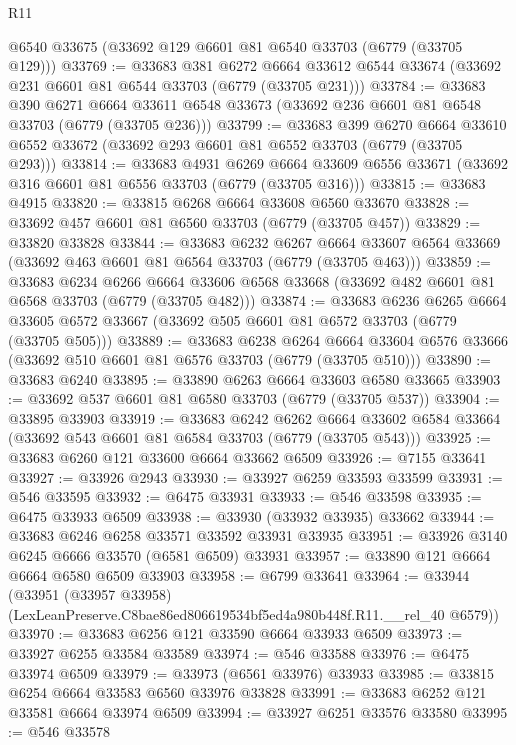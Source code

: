 \begin{lexlean}{R11}
\begin{coremodule}
    @6540
    @33675
    (@33692 @129 @6601 @81 @6540 @33703 (@6779 (@33705 @129)))
@33769 := @33683
    @381
    @6272
    @6664
    @33612
    @6544
    @33674
    (@33692 @231 @6601 @81 @6544 @33703 (@6779 (@33705 @231)))
@33784 := @33683
    @390
    @6271
    @6664
    @33611
    @6548
    @33673
    (@33692 @236 @6601 @81 @6548 @33703 (@6779 (@33705 @236)))
@33799 := @33683
    @399
    @6270
    @6664
    @33610
    @6552
    @33672
    (@33692 @293 @6601 @81 @6552 @33703 (@6779 (@33705 @293)))
@33814 := @33683
    @4931
    @6269
    @6664
    @33609
    @6556
    @33671
    (@33692 @316 @6601 @81 @6556 @33703 (@6779 (@33705 @316)))
@33815 := @33683 @4915
@33820 := @33815 @6268 @6664 @33608 @6560 @33670
@33828 := @33692 @457 @6601 @81 @6560 @33703 (@6779 (@33705 @457))
@33829 := @33820 @33828
@33844 := @33683
    @6232
    @6267
    @6664
    @33607
    @6564
    @33669
    (@33692 @463 @6601 @81 @6564 @33703 (@6779 (@33705 @463)))
@33859 := @33683
    @6234
    @6266
    @6664
    @33606
    @6568
    @33668
    (@33692 @482 @6601 @81 @6568 @33703 (@6779 (@33705 @482)))
@33874 := @33683
    @6236
    @6265
    @6664
    @33605
    @6572
    @33667
    (@33692 @505 @6601 @81 @6572 @33703 (@6779 (@33705 @505)))
@33889 := @33683
    @6238
    @6264
    @6664
    @33604
    @6576
    @33666
    (@33692 @510 @6601 @81 @6576 @33703 (@6779 (@33705 @510)))
@33890 := @33683 @6240
@33895 := @33890 @6263 @6664 @33603 @6580 @33665
@33903 := @33692 @537 @6601 @81 @6580 @33703 (@6779 (@33705 @537))
@33904 := @33895 @33903
@33919 := @33683
    @6242
    @6262
    @6664
    @33602
    @6584
    @33664
    (@33692 @543 @6601 @81 @6584 @33703 (@6779 (@33705 @543)))
@33925 := @33683 @6260 @121 @33600 @6664 @33662 @6509
@33926 := @7155 @33641
@33927 := @33926 @2943
@33930 := @33927 @6259 @33593 @33599
@33931 := @546 @33595
@33932 := @6475 @33931
@33933 := @546 @33598
@33935 := @6475 @33933 @6509
@33938 := @33930 (@33932 @33935) @33662
@33944 := @33683 @6246 @6258 @33571 @33592 @33931 @33935
@33951 := @33926 @3140 @6245 @6666 @33570 (@6581 @6509) @33931
@33957 := @33890 @121 @6664 @6664 @6580 @6509 @33903
@33958 := @6799 @33641
@33964 := @33944
    (@33951 (@33957 @33958) (LexLeanPreserve.C8bae86ed806619534bf5ed4a980b448f.R11.__rel_40 @6579))
@33970 := @33683 @6256 @121 @33590 @6664 @33933 @6509
@33973 := @33927 @6255 @33584 @33589
@33974 := @546 @33588
@33976 := @6475 @33974 @6509
@33979 := @33973 (@6561 @33976) @33933
@33985 := @33815 @6254 @6664 @33583 @6560 @33976 @33828
@33991 := @33683 @6252 @121 @33581 @6664 @33974 @6509
@33994 := @33927 @6251 @33576 @33580
@33995 := @546 @33578

\end{coremodule}
\end{lexlean}
